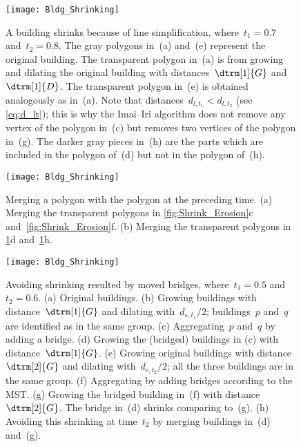 \begin{figure}[tb]
	\centering
	\texttt{[image: Bldg\_Shrinking]}
	\caption{A building shrinks because of line simplification, 
		where~$t_1=0.7$ and~$t_2=0.8$.
		The gray polygons in~(a) and~(e) 
		represent the original building.
		The transparent polygon in~(a) is from 
		growing and dilating the original building with 
		distances~$\dtrm[1]{G}$ and~$\dtrm[1]{D}$.
		The transparent polygon in~(e) is obtained analogously
		as in~(a).
		Note that distances~$d_{l,t_1}<d_{l,t_2}$ 
		(see \eq\ref{eq:d_lt});
		this is why the Imai--Iri algorithm does not 
		remove any vertex of the polygon in~(c)
		but removes two vertices of the polygon in~(g).
		The darker gray pieces in~(h) are 
		the parts which are included in the polygon of~(d) 
		but not in the polygon of~(h).
	}
	\label{fig:Shrink_Simplification}
\end{figure}

\begin{figure}[tb]
	\centering
	\texttt{[image: Bldg\_Shrinking]}
	\caption{Merging a polygon with the polygon 
		at the preceding time.
		(a) Merging the transparent polygons in 
		\figs\ref{fig:Shrink_Erosion}c and~\ref{fig:Shrink_Erosion}f.
		(b) Merging the transparent polygons in 
		\figs\ref{fig:Shrink_Simplification}d and~\ref{fig:Shrink_Simplification}h.
	}
	\label{fig:Shrink_Uniting}
\end{figure}

\begin{figure}[tb]
	\centering
	\texttt{[image: Bldg\_Shrinking]}
	\caption{Avoiding shrinking resulted by moved bridges,
		where~$t_1=0.5$ and~$t_2=0.6$.
		(a) Original buildings.
		(b) Growing buildings with distance~$\dtrm[1]{G}$ and 
		dilating with~$d_{\varepsilon,t_1}/2$;
		buildings~$p$ and~$q$ are identified as in the same 
		group.
		(c) Aggregating~$p$ and~$q$	by adding a bridge.
		(d) Growing the (bridged) buildings in (c)
		with distance~$\dtrm[1]{G}$.
		(e) Growing original buildings with 
		distance~$\dtrm[2]{G}$ and 
		dilating with~$d_{\varepsilon,t_2}/2$;
		all the three buildings are in the same group.
		(f) Aggregating	by adding bridges according to the MST.
		(g) Growing the bridged building in~(f)
		with distance~$\dtrm[2]{G}$. 
		The bridge in~(d) shrinks comparing to~(g).
		(h) Avoiding this shrinking at time~$t_2$ 
		by merging buildings in~(d) and~(g).
	}
	\label{fig:BridgeDisappearing}
\end{figure}



